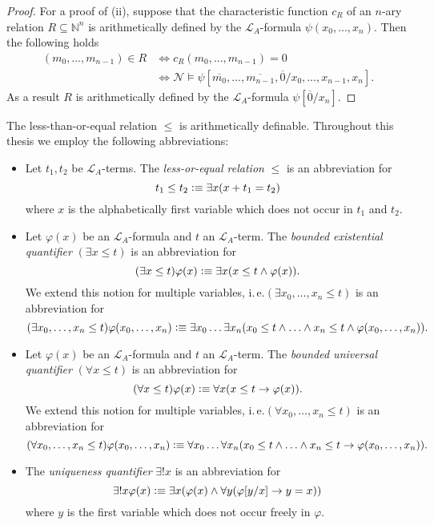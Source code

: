 \begin{proof}
For a proof of (ii), suppose that the characteristic function $c_R$ of an $n$-ary relation $R\subseteq \mathbb{N}^n$ is arithmetically defined by the $\mathcal{L}_A$-formula $\psi(x_0, \ldots,x_{n})$. Then the following holds
\begin{align*}
(m_0, \ldots, m_{n-1}) \in R & \Leftrightarrow c_R(m_0,\ldots, m_{n-1}) = 0  \\
& \Leftrightarrow \mathcal{N} \vDash \psi[\overline{m_0}, \ldots, \overline{m_{n-1}}, \overline{0} / x_0, \ldots, x_{n-1}, x_{n}].
\end{align*} 
As a result $R$ is arithmetically defined by the $\mathcal{L}_A$-formula $\psi[\overline{0}/x_{n}]$.
\end{proof}

The less-than-or-equal relation $\le$ is arithmetically definable. Throughout this thesis we employ the following abbreviations:
\begin{itemize}
\item Let $t_1, t_2$ be $\mathcal{L}_A$-terms. The \textit{less-or-equal relation} $\le$ is an abbreviation for \[t_1 \le t_2 \vcentcolon \equiv \exists x(x + t_1 = t_2)\] where $x$ is the alphabetically first variable which does not occur in $t_1$ and $t_2$. 
\item Let $\varphi(x)$ be an $\mathcal{L}_A$-formula and $t$ an $\mathcal{L}_A$-term. The \textit{bounded existential quantifier} $(\exists x \le t)$ is an abbreviation for \[(\exists x \le t)  \varphi(x) \vcentcolon \equiv \exists x (x \le t \wedge \varphi(x)).\] We extend this notion for multiple variables, i.\,e.\@ $(\exists x_0, \ldots, x_n \le t)$ is an abbreviation for \[(\exists x_0, \ldots, x_n \le t)  \varphi(x_0, \ldots, x_n) \vcentcolon \equiv \exists x_0 \ldots \exists x_n (x_0 \le t \wedge \ldots \wedge x_n \le t \wedge \varphi(x_0, \ldots, x_n)).\]
\item Let $\varphi(x)$ be an $\mathcal{L}_A$-formula and $t$ an $\mathcal{L}_A$-term. The \textit{bounded universal quantifier} $(\forall x \le t)$ is an abbreviation for \[ (\forall x \le t)  \varphi(x) \vcentcolon \equiv \forall x (x \le t \rightarrow \varphi(x)).\]We extend this notion for multiple variables, i.\,e.\@ $(\forall x_0, \ldots, x_n \le t)$ is an abbreviation for \[(\forall x_0, \ldots, x_n \le t)  \varphi(x_0, \ldots, x_n) \vcentcolon \equiv \forall x_0 \ldots \forall x_n (x_0 \le t \wedge \ldots \wedge x_n \le t \rightarrow \varphi(x_0, \ldots, x_n)). \]
\item The \textit{uniqueness quantifier} $\exists ! x $ is an abbreviation for \[\exists ! x  \varphi(x) \vcentcolon \equiv \exists x(\varphi(x) \wedge  \forall y  (\varphi[y/x] \rightarrow y = x))\] where $y$ is the first variable which does not occur freely in $\varphi$. 
\end{itemize}

